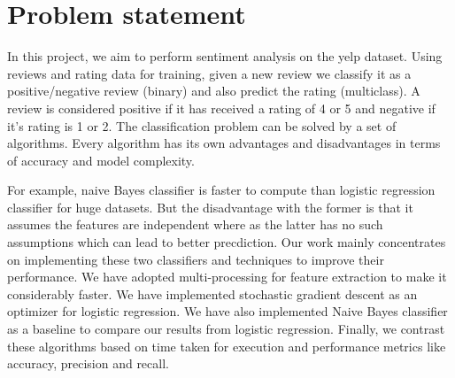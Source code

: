 \documentclass{article}
\begin{document}
 









 


\section{Problem statement}
In this project, we aim to perform sentiment analysis on the yelp dataset. Using reviews and rating data for training, given a new review we classify it as a positive/negative review (binary) and also predict the rating (multiclass). A review is considered positive if it has received a rating of 4 or 5 and negative if it's rating is 1 or 2. The classification problem can be solved by a set of algorithms. Every algorithm has its own advantages and disadvantages in terms of accuracy and model complexity. 

For example, naive Bayes classifier is faster to compute than logistic regression classifier for huge datasets. But the disadvantage with the former is that it assumes the features are independent where as the latter has no such assumptions which can lead to better precdiction. Our work mainly concentrates on implementing these two classifiers and techniques to improve their performance. We have adopted multi-processing for feature extraction to make it considerably faster. We have implemented stochastic gradient descent as an optimizer for logistic regression. We have also implemented Naive Bayes classifier as a baseline to compare our results from logistic regression. Finally, we contrast these algorithms based on time taken for execution and performance metrics like accuracy, precision and recall.
\end{document}

